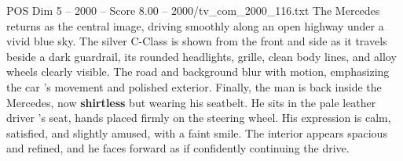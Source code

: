 \begin{textsample}{POS Dim 5 – 2000 – Score 8.00 – 2000/tv\_com\_2000\_116.txt}
The Mercedes returns as the central image, driving smoothly along an open highway under a vivid blue sky.
The silver C-Class is shown from the front and side as it travels beside a dark guardrail, its rounded headlights, grille, clean body lines, and alloy wheels clearly visible.
The road and background blur with motion, emphasizing the car ’s movement and polished exterior.
Finally, the man is back inside the Mercedes, now \textbf{shirtless} but wearing his seatbelt.
He sits in the pale leather driver ’s seat, hands placed firmly on the steering wheel.
His expression is calm, satisfied, and slightly amused, with a faint smile.
The interior appears spacious and refined, and he faces forward as if confidently continuing the drive.

\end{textsample}
